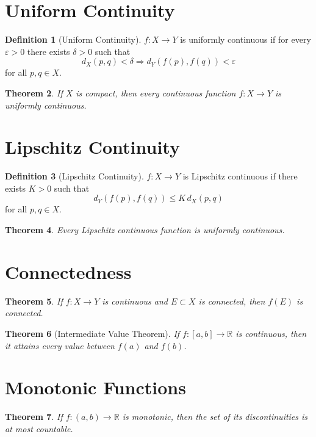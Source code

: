 \documentclass[11pt]{book}
\theoremstyle{definition}
\newtheorem{definition}{Definition}[chapter]
\theoremstyle{plain}
\newtheorem{theorem}[definition]{Theorem}
\newcommand{\R}{\mathbb{R}}
\begin{document}
\section{Uniform Continuity}

\begin{definition}[Uniform Continuity]
$f:X\to Y$ is uniformly continuous if for every $\varepsilon>0$
there exists $\delta>0$ such that
\[
d_X(p,q)<\delta \Rightarrow d_Y(f(p),f(q))<\varepsilon
\]
for all $p,q\in X$.
\end{definition}

\begin{theorem}
If $X$ is compact, then every continuous function $f:X\to Y$
is uniformly continuous.
\end{theorem}

\section{Lipschitz Continuity}

\begin{definition}[Lipschitz Continuity]
$f:X\to Y$ is Lipschitz continuous if there exists $K>0$ such that
\[
d_Y(f(p),f(q))\le K\,d_X(p,q)
\]
for all $p,q\in X$.
\end{definition}

\begin{theorem}
Every Lipschitz continuous function is uniformly continuous.
\end{theorem}

\section{Connectedness}

\begin{theorem}
If $f:X\to Y$ is continuous and $E\subset X$ is connected,
then $f(E)$ is connected.
\end{theorem}

\begin{theorem}[Intermediate Value Theorem]
If $f:[a,b]\to\R$ is continuous, then it attains every value between
$f(a)$ and $f(b)$.
\end{theorem}

\section{Monotonic Functions}

\begin{theorem}
If $f:(a,b)\to\R$ is monotonic, then the set of its discontinuities
is at most countable.
\end{theorem}
\end{document}
